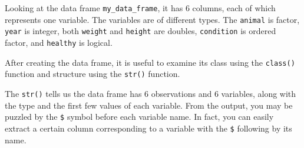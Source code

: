\documentclass[
]{book}
\newenvironment{Shaded}{\begin{snugshade}}{\end{snugshade}}
\newcommand{\CommentTok}[1]{\textcolor[rgb]{0.56,0.35,0.01}{\textit{#1}}}
\newcommand{\FunctionTok}[1]{\textcolor[rgb]{0.00,0.00,0.00}{#1}}
\newcommand{\NormalTok}[1]{#1}
\newcommand{\SpecialCharTok}[1]{\textcolor[rgb]{0.00,0.00,0.00}{#1}}
\begin{document}
Looking at the data frame \texttt{my\_data\_frame}, it has 6 columns, each of which represents one variable. The variables are of different types. The \texttt{animal} is factor, \texttt{year} is integer, both \texttt{weight} and \texttt{height} are doubles, \texttt{condition} is ordered factor, and \texttt{healthy} is logical.

After creating the data frame, it is useful to examine its class using the \texttt{class()} function and structure using the \texttt{str()} function.

\begin{Shaded}
\end{Shaded}

The \texttt{str()} tells us the data frame has 6 observations and 6 variables, along with the type and the first few values of each variable. From the output, you may be puzzled by the \texttt{\$} symbol before each variable name. In fact, you can easily extract a certain column corresponding to a variable with the \texttt{\$} following by its name.

\begin{Shaded}
\end{Shaded}
\end{document}
